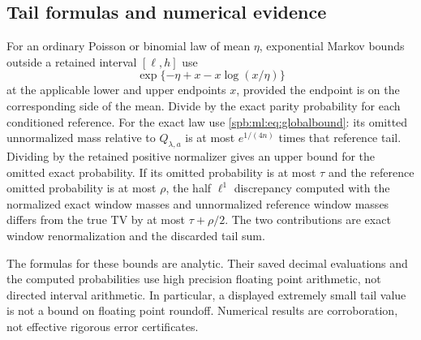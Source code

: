 \subsection{Tail formulas and numerical evidence}
For an ordinary Poisson or binomial law of mean $\eta$, exponential Markov bounds outside a retained interval $[\ell,h]$ use
\[
 \exp\{-\eta+x-x\log(x/\eta)\}
\]
at the applicable lower and upper endpoints $x$, provided the endpoint is on the corresponding side of the mean. Divide by the exact parity probability for each conditioned reference. For the exact law use \eqref{spb:ml:eq:globalbound}: its omitted unnormalized mass relative to $Q_{\lambda,a}$ is at most $e^{1/(4n)}$ times that reference tail. Dividing by the retained positive normalizer gives an upper bound for the omitted exact probability. If its omitted probability is at most $\tau$ and the reference omitted probability is at most $\rho$, the half $\ell^1$ discrepancy computed with the normalized exact window masses and unnormalized reference window masses differs from the true TV by at most $\tau+\rho/2$. The two contributions are exact window renormalization and the discarded tail sum.

The formulas for these bounds are analytic. Their saved decimal evaluations and the computed probabilities use high precision floating point arithmetic, not directed interval arithmetic. In particular, a displayed extremely small tail value is not a bound on floating point roundoff. Numerical results are corroboration, not effective rigorous error certificates.

